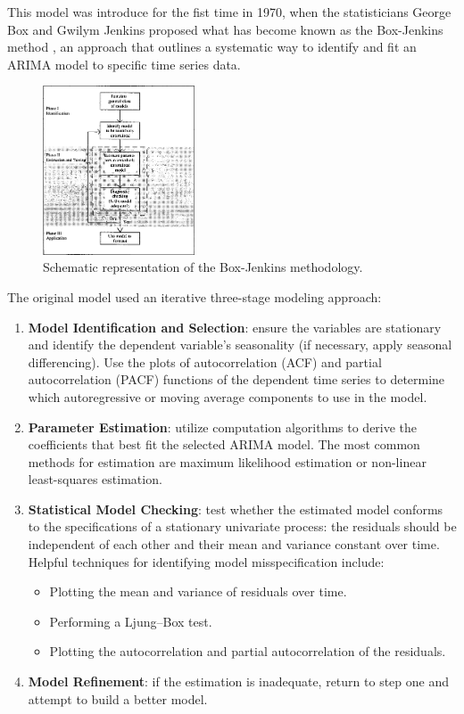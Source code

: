 This model was introduce for the fist time in 1970, when the statisticians George Box and Gwilym Jenkins proposed what has become known as the Box-Jenkins method \cite{box1970time}, an approach that outlines a systematic way to identify and fit an ARIMA model to specific time series data.
\begin{figure}[H] 
    \centering
    \includegraphics[width=0.4\textwidth]{Machine_learning_thesis/Images/Box_Jenkins_methodology.png}
    \caption{Schematic representation of the Box-Jenkins methodology.} 
    \label{fig:box_jenkins_methodology} 
\end{figure}

The original model used an iterative three-stage modeling approach:
\begin{enumerate}
    \item \textbf{Model Identification and Selection}: ensure the variables are stationary and identify the dependent variable's seasonality (if necessary, apply seasonal differencing). Use the plots of autocorrelation (ACF) and partial autocorrelation (PACF) functions of the dependent time series to determine which autoregressive or moving average components to use in the model.
    \item \textbf{Parameter Estimation}: utilize computation algorithms to derive the coefficients that best fit the selected ARIMA model. The most common methods for estimation are maximum likelihood estimation or non-linear least-squares estimation.
    \item \textbf{Statistical Model Checking}: test whether the estimated model conforms to the specifications of a stationary univariate process:  the residuals should be independent of each other and their mean and variance constant over time. Helpful techniques for identifying model misspecification include:
    \begin{itemize}
            \item Plotting the mean and variance of residuals over time.
            \item Performing a Ljung–Box test.
            \item Plotting the autocorrelation and partial autocorrelation of the residuals.

    \end{itemize}
    \item \textbf{Model Refinement}: if the estimation is inadequate, return to step one and attempt to build a better model.
\end{enumerate}

